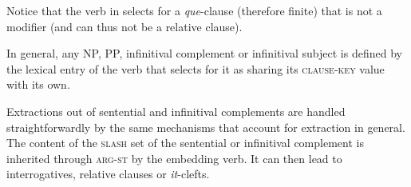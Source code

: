 Notice that the verb in  selects for a \emph{que}-clause (therefore finite) that is not a modifier (and can thus not be a relative clause). 

In general, any NP, PP, infinitival complement or infinitival subject is defined by the lexical entry of the verb that selects for it as sharing its \textsc{clause-key} value with its own.

Extractions out of sentential and infinitival complements are handled straightforwardly by the same mechanisms that account for extraction in general. The content of the \textsc{slash} set of the sentential or infinitival complement is inherited through \textsc{arg-st} by the embedding verb. It can then lead to interrogatives, relative clauses or \emph{it}-clefts.

